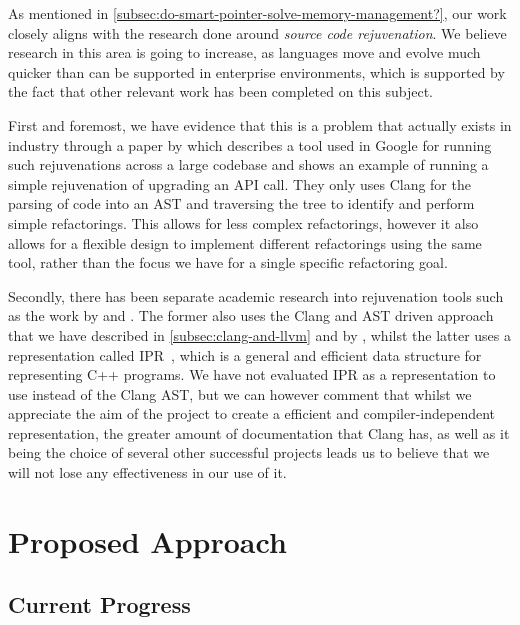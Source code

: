 \documentclass{proposal}
\begin{document}
    As mentioned in \autoref{subsec:do-smart-pointer-solve-memory-management?}, our work closely aligns with the research done around \emph{source code rejuvenation}.
    We believe research in this area is going to increase, as languages move and evolve much quicker than can be supported in enterprise environments, which is supported by the fact that other relevant work has been completed on this subject.

    First and foremost, we have evidence that this is a problem that actually exists in industry through a paper by \citet{Wright2013} which describes a tool used in Google for running such rejuvenations across a large codebase and shows an example of running a simple rejuvenation of upgrading an API call.
    They only uses Clang for the parsing of code into an AST and traversing the tree to identify and perform simple refactorings.
    This allows for less complex refactorings, however it also allows for a flexible design to implement different refactorings using the same tool, rather than the focus we have for a single specific refactoring goal.

    Secondly, there has been separate academic research into rejuvenation tools such as the work by \citet{Huck2016} and \citet{Kumar2012}.
    The former also uses the Clang and AST driven approach that we have described in \autoref{subsec:clang-and-llvm} and by \citet{Wright2013}, whilst the latter uses a representation called IPR~\cite{Dos2011}, which is a general and efficient data structure for representing C++ programs.
    We have not evaluated IPR as a representation to use instead of the Clang AST, but we can however comment that whilst we appreciate the aim of the project to create a efficient and compiler-independent representation, the greater amount of documentation that Clang has, as well as it being the choice of several other successful projects leads us to believe that we will not lose any effectiveness in our use of it.




    \section{Proposed Approach}\label{sec:proposed-approach}


    \subsection{Current Progress}\label{subsec:current-progress}
\end{document}
